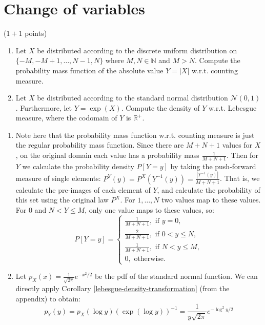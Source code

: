 \section{Change of variables}
($1+1$ points)
\begin{enumerate}
\item Let $X$ be distributed according to the discrete uniform distribution on $\{-M, -M+1, \dots, N-1, N\}$ where $M,N \in \mathbb{N}$ and $M>N$. Compute the probability mass function of the absolute value $Y=|X|$ w.r.t. counting measure.
\item Let $X$ be distributed according to the standard normal distribution $\mathcal{N}(0,1)$. Furthermore, let $Y = \exp (X)$. Compute the density of $Y$ w.r.t. Lebesgue measure, where the codomain of $Y$ is $\mathbb{R}^+$.
\end{enumerate}
\begin{gradedsolution}
    \begin{enumerate}
        \item Note here that the probability mass function w.r.t. counting measure is just the regular probability mass function. Since there are $M+N+1$ values for $X$, on the original domain each value has a probability mass $\frac{1}{M+N+1}$. Then for $Y$ we calculate the probability density $P[Y=y]$ by taking the push-forward measure of single elements: $P^Y(y) = P^X(Y^{-1}(y)) = \frac{|Y^{-1}(y)|}{M+N+1}$. That is, we calculate the pre-images of each element of $Y$, and calculate the probability of this set using the original law $P^X$. For $1, \dots, N$ two values map to these values. For $0$ and $N < Y \leq M$, only one value maps to these values, so:
        \[
            P[Y=y] = \begin{cases}
            \frac{1}{M+N+1}, \text{ if } y = 0,\\
            \frac{2}{M+N+1}, \text{ if } 0 < y \leq N,\\
            \frac{1}{M+N+1}, \text{ if } N < y \leq M,\\
            0, \text{ otherwise.}
          \end{cases}
        \]
        \item Let $p_X(x)=\frac{1}{\sqrt{2\pi}} e^{-x^2/2}$ be the pdf of the standard normal function. We can directly apply Corollary \ref*{lebesgue-density-transformation} (from the appendix) to obtain:
        \[
          p_Y(y) = p_X(\log y) (\exp(\log y))^{-1} = \frac{1}{y\sqrt{2\pi}} e^{-\log^2 y/2}
        \]
    \end{enumerate}
\end{gradedsolution}


